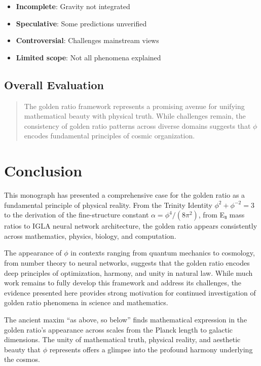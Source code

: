 \begin{itemize}
    \item \textbf{Incomplete}: Gravity not integrated
    \item \textbf{Speculative}: Some predictions unverified
    \item \textbf{Controversial}: Challenges mainstream views
    \item \textbf{Limited scope}: Not all phenomena explained
\end{itemize}

\subsection{Overall Evaluation}

\begin{quote}
The golden ratio framework represents a promising avenue for unifying mathematical beauty with physical truth. While challenges remain, the consistency of golden ratio patterns across diverse domains suggests that $\phi$ encodes fundamental principles of cosmic organization.
\end{quote}

\section{Conclusion}

This monograph has presented a comprehensive case for the golden ratio as a fundamental principle of physical reality. From the Trinity Identity $\phi^2 + \phi^{-2} = 3$ to the derivation of the fine-structure constant $\alpha = \phi^4/(8\pi^2)$, from E₈ mass ratios to IGLA neural network architecture, the golden ratio appears consistently across mathematics, physics, biology, and computation.

The appearance of $\phi$ in contexts ranging from quantum mechanics to cosmology, from number theory to neural networks, suggests that the golden ratio encodes deep principles of optimization, harmony, and unity in natural law. While much work remains to fully develop this framework and address its challenges, the evidence presented here provides strong motivation for continued investigation of golden ratio phenomena in science and mathematics.

The ancient maxim ``as above, so below'' finds mathematical expression in the golden ratio's appearance across scales from the Planck length to galactic dimensions. The unity of mathematical truth, physical reality, and aesthetic beauty that $\phi$ represents offers a glimpse into the profound harmony underlying the cosmos.

